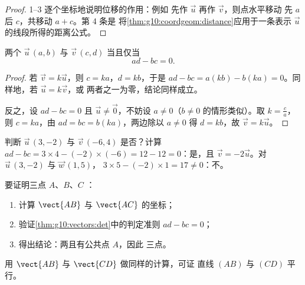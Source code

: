 \begin{proof}
1--3 逐个坐标地说明位移的作用：例如
先作 $\vec u$ 再作 $\vec v$，则点水平移动
先 $a$ 后 $c$，共移动 $a + c$。第 4 条是
将\cref{thm:g10:coordgeom:distance}应用于一条表示
$\vec u$ 的线段所得的距离公式。
\end{proof}

\begin{theorem}[共线判定准则]\label{thm:g10:vectors:det}
两个 $\vec u\,(a, b)$ 与 $\vec v\,(c, d)$ 
当且仅当
\[
ad - bc = 0 .
\]
\end{theorem}

\begin{proof}
若 $\vec v = k\vec u$，则 $c = ka$，$d = kb$，于是
$ad - bc = a(kb) - b(ka) = 0$。同样地，若 $\vec u = k \vec v$，或
两者之一为零，结论同样成立。

反之，设 $ad - bc = 0$ 且 $\vec u \neq \vec 0$，不妨设
$a \neq 0$（$b \neq 0$ 的情形类似）。取 $k = \frac{c}{a}$，则
$c = ka$，由 $ad = bc = b(ka)$，两边除以 $a \neq 0$ 得
$d = kb$，故 $\vec v = k\vec u$。
\end{proof}

\begin{example}\label{ex:g10:vectors:det}
判断 $\vec u\,(3, -2)$ 与 $\vec v\,(-6, 4)$ 是否？计算
$ad - bc = 3 \times 4 - (-2)\times(-6) = 12 - 12 = 0$：是，且
$\vec v = -2\vec u$。对 $\vec u\,(3, -2)$ 与 $\vec w\,(1, 5)$，
$3 \times 5 - (-2) \times 1 = 17 \neq 0$：不。
\end{example}

\begin{method}[三点共线与平行的证明]\label{met:g10:vectors:alignment}
要证明三点 $A$、$B$、$C$ ：
\begin{enumerate}
  \item 计算 $\vect{AB}$ 与 $\vect{AC}$ 的坐标；
  \item 验证\cref{thm:g10:vectors:det}中的判定准则 $ad - bc = 0$；
  \item 得出结论：两且有公共点 $A$，因此
        三点。
\end{enumerate}
用 $\vect{AB}$ 与 $\vect{CD}$ 做同样的计算，可证
直线 $(AB)$ 与 $(CD)$ 平行。
\end{method}

